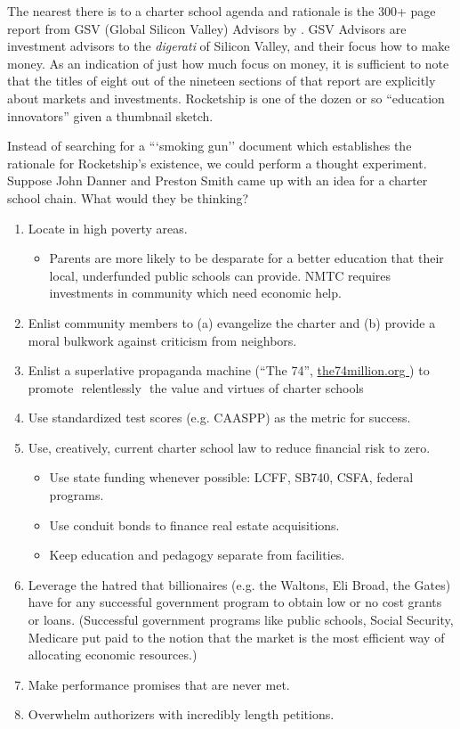 The nearest there is to a charter school agenda and rationale is the 300+ page report from GSV (Global Silicon Valley) Advisors  by \citeauthor{Moe.etal2012}. GSV Advisors are investment advisors to the \emph{digerati} of Silicon Valley, and their focus how to make money. As an indication of just how much  focus on money, it is sufficient to note that the titles of eight out of the nineteen sections of that report are explicitly about markets and investments. Rocketship is one of the dozen or so ``education innovators'' given a thumbnail sketch. %

Instead of searching for a ```smoking gun'' document which establishes the rationale for Rocketship's existence, we could perform a thought experiment. Suppose John Danner and Preston Smith came up with an idea for a charter school chain. What would they be thinking?
\begin{enumerate}
  \item Locate in high poverty areas.
  \begin{itemize}
    \item Parents are more likely to be desparate for a better education that their local, underfunded public schools can provide.
    NMTC requires investments in community which need economic help.
  \end{itemize}
  \item Enlist community members to (a) evangelize the charter and (b) provide a moral bulkwork against criticism from neighbors.
  \item Enlist a superlative propaganda machine (``The 74'', \url{the74million.org }) to promote ­ relentlessly ­ the value and virtues of charter schools
  \item Use standardized test scores (e.g. CAASPP) as the metric for success.
  \item Use, creatively, current charter school law to reduce financial risk to zero.
  \begin{itemize}
    \item Use state funding whenever possible: LCFF, SB740, CSFA, federal programs.
    \item Use conduit bonds to finance real estate acquisitions.
    \item Keep education and pedagogy separate from facilities.
  \end{itemize}
  \item Leverage the hatred that billionaires (e.g. the Waltons, Eli Broad, the Gates) have for any successful government program to obtain low or no cost grants or loans. (Successful government programs like public schools, Social Security, Medicare put paid to the notion that the market is the most efficient way of allocating economic resources.)
  \item Make performance promises that are never met.
  \item Overwhelm authorizers with incredibly length petitions.
\end{enumerate}

